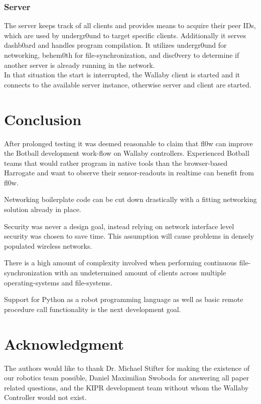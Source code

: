 \documentclass[conference,a4paper]{IEEEtran}
\begin{document}
\subsubsection{Server}
The server keeps track of all clients and provides means to acquire their peer IDs, which are used by undergr0und to target specific clients. Additionally it serves dashb0ard and handles program compilation. It utilizes undergr0und for networking, behem0th for file-synchronization, and disc0very to determine if another server is already running in the network. \\
In that situation the start is interrupted, the Wallaby client is started and it connects to the available server instance, otherwise server and client are started. \\

\section{Conclusion}
After prolonged testing it was deemed reasonable to claim that fl0w can improve the Botball development work-flow on Wallaby controllers. Experienced Botball teams that would rather program in native tools than the browser-based Harrogate and want to observe their sensor-readouts in realtime can benefit from fl0w.

Networking boilerplate code can be cut down drastically with a fitting networking solution already in place.

Security was never a design goal, instead relying on network interface level security was chosen to save time. This assumption will cause problems in densely populated wireless networks.

There is a high amount of complexity involved when performing continuous file-synchronization with an undetermined amount of clients across multiple operating-systems and file-systems.

Support for Python as a robot programming language as well as basic remote procedure call functionality is the next development goal.

\section*{Acknowledgment}
The authors would like to thank Dr. Michael Stifter for making the existence of our robotics team possible, Daniel Maximilian Swoboda for answering all paper related questions, and the KIPR development team without whom the Wallaby Controller would not exist.
\end{document}
